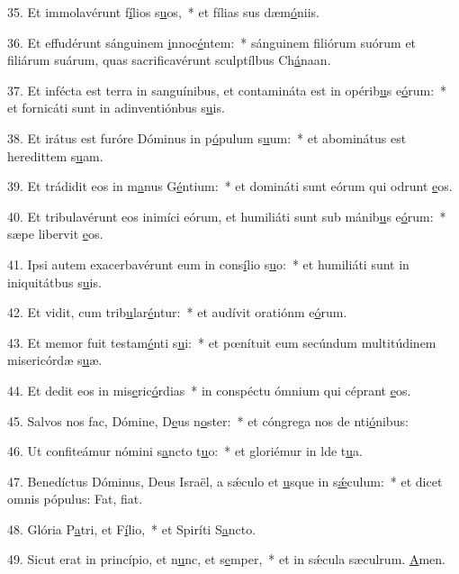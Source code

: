 35. Et immolavérunt f\uline{í}lios s\uline{u}os,~* et fílias sus dæm\uline{ó}niis.\par 
36. Et effudérunt sánguinem \uline{i}nnoc\uline{é}ntem:~* sánguinem filiórum suórum et filiárum suárum, quas sacrificavérunt sculptílbus Ch\uline{á}naan.\par 
37. Et infécta est terra in sanguínibus, et contamináta est in opérib\uline{u}s e\uline{ó}rum:~* et fornicáti sunt in adinventiónbus s\uline{u}is.\par 
38. Et irátus est furóre Dóminus in p\uline{ó}pulum s\uline{u}um:~* et abominátus est heredittem s\uline{u}am.\par 
39. Et trádidit eos in m\uline{a}nus G\uline{é}ntium:~* et domináti sunt eórum qui odrunt \uline{e}os.\par 
40. Et tribulavérunt eos inimíci eórum, et humiliáti sunt sub mánib\uline{u}s e\uline{ó}rum:~* sæpe libervit \uline{e}os.\par 
41. Ipsi autem exacerbavérunt eum in cons\uline{í}lio s\uline{u}o:~* et humiliáti sunt in iniquitátbus s\uline{u}is.\par 
42. Et vidit, cum trib\uline{u}lar\uline{é}ntur:~* et audívit oratiónm e\uline{ó}rum.\par 
43. Et memor fuit testam\uline{é}nti s\uline{u}i:~* et pœnítuit eum secúndum multitúdinem misericórdæ s\uline{u}æ.\par 
44. Et dedit eos in mis\uline{e}ric\uline{ó}rdias~* in conspéctu ómnium qui céprant \uline{e}os.\par 
45. Salvos nos fac, Dómine, D\uline{e}us n\uline{o}ster:~* et cóngrega nos de nti\uline{ó}nibus:\par 
46. Ut confiteámur nómini s\uline{a}ncto t\uline{u}o:~* et gloriémur in lde t\uline{u}a.\par 
47. Benedíctus Dóminus, Deus Israël, a sǽculo et \uline{u}sque in s\uline{ǽ}culum:~* et dicet omnis pópulus: Fat, f\uline{i}at.\par 
48. Glória P\uline{a}tri, et F\uline{í}lio,~* et Spiríti S\uline{a}ncto.\par 
49. Sicut erat in princípio, et n\uline{u}nc, et s\uline{e}mper,~* et in sǽcula sæculrum. \uline{A}men.\par 
